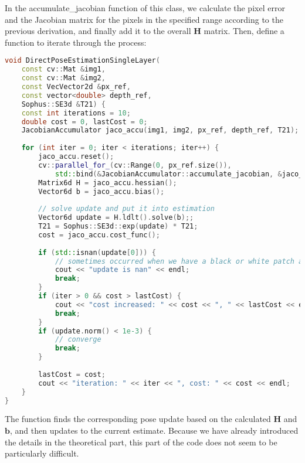 In the accumulate\_jacobian function of this class, we calculate the pixel error and the Jacobian matrix for the pixels in the specified range according to the previous derivation, and finally add it to the overall $\bm{H}$ matrix. Then, define a function to iterate through the process:
\begin{lstlisting}[language=c++,caption=slambook2/ch8/direct_method.cpp（片段）]
void DirectPoseEstimationSingleLayer(
	const cv::Mat &img1,
	const cv::Mat &img2,
	const VecVector2d &px_ref,
	const vector<double> depth_ref,
	Sophus::SE3d &T21) {
	const int iterations = 10;
	double cost = 0, lastCost = 0;
	JacobianAccumulator jaco_accu(img1, img2, px_ref, depth_ref, T21);
	
	for (int iter = 0; iter < iterations; iter++) {
		jaco_accu.reset();
		cv::parallel_for_(cv::Range(0, px_ref.size()),
			std::bind(&JacobianAccumulator::accumulate_jacobian, &jaco_accu, std::placeholders::_1));
		Matrix6d H = jaco_accu.hessian();
		Vector6d b = jaco_accu.bias();
		
		// solve update and put it into estimation
		Vector6d update = H.ldlt().solve(b);;
		T21 = Sophus::SE3d::exp(update) * T21;
		cost = jaco_accu.cost_func();
		
		if (std::isnan(update[0])) {
			// sometimes occurred when we have a black or white patch and H is irreversible
			cout << "update is nan" << endl;
			break;
		}
		if (iter > 0 && cost > lastCost) {
			cout << "cost increased: " << cost << ", " << lastCost << endl;
			break;
		}
		if (update.norm() < 1e-3) {
			// converge
			break;
		}
		
		lastCost = cost;
		cout << "iteration: " << iter << ", cost: " << cost << endl;
	}
}
\end{lstlisting}
The function finds the corresponding pose update based on the calculated $\bm{H}$ and $\bm{b}$, and then updates to the current estimate. Because we have already introduced the details in the theoretical part, this part of the code does not seem to be particularly difficult.

